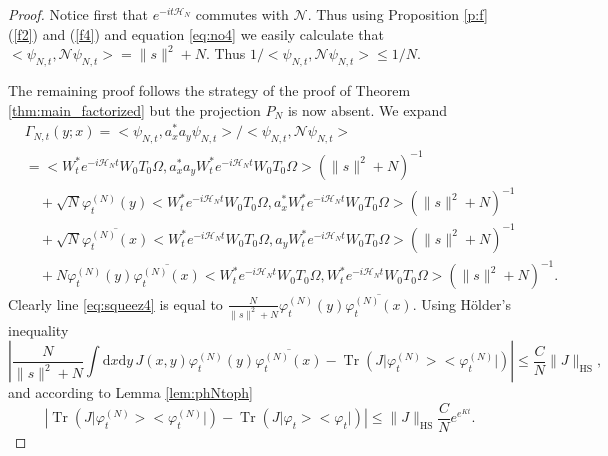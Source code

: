 \documentclass[11pt,a4paper,draft,DIV11]{scrartcl}	%
\newcommand{\di}{\textrm{d}}		%
\newcommand{\Ncal}{\mathcal{N}}		%
\newcommand{\Hcal}{\mathcal{H}}		%
\newcommand{\scal}[2]{\big<#1,#2\big>} %
\newcommand{\cc}[1]{\overline{#1}}	%
\newcommand{\norm}[1]{\lVert#1\rVert}	%
\newcommand{\ph}{\varphi_t^{(N)}}	%
\newcommand{\project}[1]{\lvert #1 \big>\big< #1\rvert}	%
\newcommand{\Tr}{\operatorname{Tr}}	%
\newcommand{\HS}{_{\textrm{HS}}}
\newcommand{\bd}{\begin{displaymath}}			%
\newcommand{\ed}{\end{displaymath}}
\newcommand{\eqr}[1]{\eqref{eq:#1}}			%
\begin{document}
\begin{proof} Notice first that $e^{-it \Hcal_N}$ commutes with $\Ncal$. Thus
using Proposition \ref{p:f} (\ref{f2}) and (\ref{f4}) and equation \eqr{no4} we easily calculate that $\scal{\psi_{N,t}}{\Ncal \psi_{N,t}} = \norm{s}^2 + N$. Thus $1/\scal{\psi_{N,t}}{\Ncal \psi_{N,t}} \leq 1/N$.

The remaining proof follows the strategy of the proof of Theorem \ref{thm:main_factorized} but the projection $P_N$ is now absent. We expand
\begin{align}
& \Gamma_{N,t}(y;x) = \scal{\psi_{N,t}}{a^\ast_x a_y \psi_{N,t}}/\scal{\psi_{N,t}}{\Ncal \psi_{N,t}} \nonumber \\
& = \scal{W^\ast_t e^{-i \Hcal_N t} W_0 T_0 \Omega}{a^\ast_x a_y W^\ast_t e^{-i\Hcal_N t} W_0 T_0 \Omega}\left(\norm{s}^2 + N\right)^{-1} \label{eq:squeez1} \\
& \quad + \sqrt{N} \ph(y) \scal{W^\ast_t e^{-i\Hcal_N t} W_0 T_0 \Omega}{a^\ast_x W^\ast_t e^{-i \Hcal_N t} W_0 T_0 \Omega}\left(\norm{s}^2 + N\right)^{-1} \label{eq:squeez3}\\
& \quad + \sqrt{N} \cc{\ph(x)} \scal{W^\ast_t e^{-i\Hcal_N t} W_0 T_0 \Omega}{a_y W^\ast_t e^{-i \Hcal_N t} W_0 T_0 \Omega} \left(\norm{s}^2 + N\right)^{-1} \label{eq:squeez2}\\
& \quad + N \ph(y) \cc{\ph(x)} \scal{W^\ast_t e^{-i\Hcal_N t} W_0 T_0 \Omega}{W^\ast_t e^{-i\Hcal_N t} W_0 T_0 \Omega}\left(\norm{s}^2 + N\right)^{-1}. \label{eq:squeez4}
\end{align}
Clearly line \eqref{eq:squeez4} is equal to $\frac{N}{\norm{s}^2+N} \ph(y) \cc{\ph(x)}$. Using H\"older's inequality
\[
\left\lvert \frac{N}{\norm{s}^2+N} \int \di x \di y\, J(x,y) \ph(y) \cc{\ph(x)} - \Tr\left( J \project{\ph}  \right) \right\rvert \leq \frac{C}{N} \norm{J}\HS,
\]
and according to Lemma \ref{lem:phNtoph}
\bd
\left\lvert \Tr\left(J \project{\ph}\right) - \Tr\left(J \project{\varphi_t}\right) \right\rvert \leq \norm{J}_{\textrm{HS}} \frac{C}{N} e^{e^{Kt}}.
\ed


\end{proof}
\end{document}
